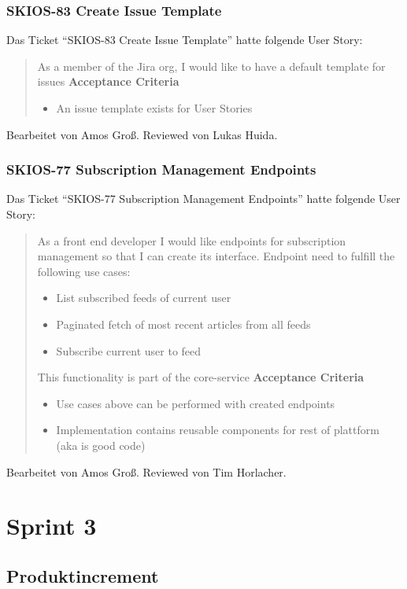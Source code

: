 \subsubsection{SKIOS-83 Create Issue Template}
Das Ticket \enquote{SKIOS-83 Create Issue Template} hatte folgende User Story:
\begin{quotation}
    As a member of the Jira org, I would like to have a default template for issues
\textbf{Acceptance Criteria}
\begin{itemize}
    \item An issue template exists for User Stories
\end{itemize}
\end{quotation}
Bearbeitet von Amos Groß.
Reviewed von Lukas Huida.

\subsubsection{SKIOS-77 Subscription Management Endpoints}
Das Ticket \enquote{SKIOS-77 Subscription Management Endpoints} hatte folgende User Story:
\begin{quotation}
    As a front end developer I would like endpoints for subscription management so that I can create its interface.
    Endpoint need to fulfill the following use cases:
    \begin{itemize}
        \item List subscribed feeds of current user
        \item Paginated fetch of most recent articles from all feeds
        \item Subscribe current user to feed
    \end{itemize}

    This functionality is part of the core-service
\textbf{Acceptance Criteria}
\begin{itemize}
    \item Use cases above can be performed with created endpoints
    \item Implementation contains reusable components for rest of plattform (aka is good code)
\end{itemize}
\end{quotation}
Bearbeitet von Amos Groß.
Reviewed von Tim Horlacher.

\section{Sprint 3}

\subsection{Produktincrement}
